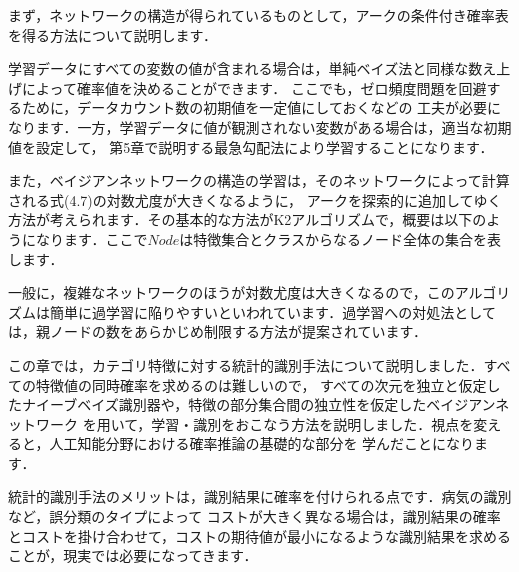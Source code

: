まず，ネットワークの構造が得られているものとして，アークの条件付き確率表を得る方法について説明します．

学習データにすべての変数の値が含まれる場合は，単純ベイズ法と同様な数え上げによって確率値を決めることができます．
ここでも，ゼロ頻度問題を回避するために，データカウント数の初期値を一定値にしておくなどの
工夫が必要になります．一方，学習データに値が観測されない変数がある場合は，適当な初期値を設定して，
第5章で説明する最急勾配法により学習することになります．

また，ベイジアンネットワークの構造の学習は，そのネットワークによって計算される式(4.7)の対数尤度が大きくなるように，
アークを探索的に追加してゆく方法が考えられます．その基本的な方法がK2アルゴリズムで，概要は以下のようになります．ここで$Node$は特徴集合とクラスからなるノード全体の集合を表します．


一般に，複雑なネットワークのほうが対数尤度は大きくなるので，このアルゴリズムは簡単に過学習に陥りやすいといわれています．過学習への対処法としては，親ノードの数をあらかじめ制限する方法が提案されています．


この章では，カテゴリ特徴に対する統計的識別手法について説明しました．すべての特徴値の同時確率を求めるのは難しいので，
すべての次元を独立と仮定したナイーブベイズ識別器や，特徴の部分集合間の独立性を仮定したベイジアンネットワーク
を用いて，学習・識別をおこなう方法を説明しました．視点を変えると，人工知能分野における確率推論の基礎的な部分を
学んだことになります．

統計的識別手法のメリットは，識別結果に確率を付けられる点です．病気の識別など，誤分類のタイプによって
コストが大きく異なる場合は，識別結果の確率とコストを掛け合わせて，コストの期待値が最小になるような識別結果を求める
ことが，現実では必要になってきます．
